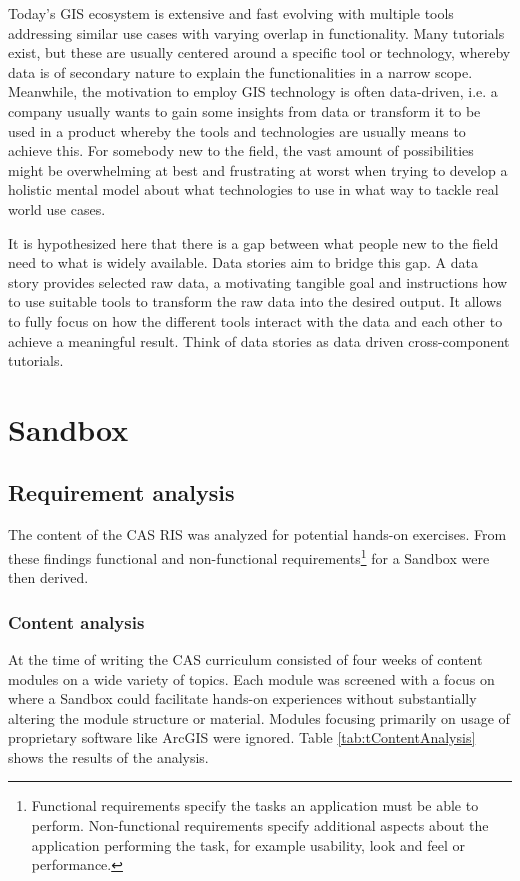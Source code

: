 \documentclass[11pt, a4paper, oneside, parskip=full-]{scrartcl}
\begin{document}
Today's GIS ecosystem is extensive and fast evolving with multiple tools
addressing similar use cases with varying overlap in functionality. Many
tutorials exist, but these are usually centered around a specific tool or
technology, whereby data is of secondary nature to explain the functionalities
in a narrow scope. Meanwhile, the motivation to employ GIS technology is often
data-driven, i.e. a company usually wants to gain some insights from data or
transform it to be used in a product whereby the tools and technologies are
usually means to achieve this. For somebody new to the field, the vast amount of
possibilities might be overwhelming at best and frustrating at worst when trying
to develop a holistic mental model about what technologies to use in what way to
tackle real world use cases.

It is hypothesized here that there is a gap between what people new to the field
need to what is widely available. Data stories aim to bridge this gap. A data
story provides selected raw data, a motivating tangible goal and instructions
how to use suitable tools to transform the raw data into the desired output. It
allows to fully focus on how the different tools interact with the data and each
other to achieve a meaningful result. Think of data stories as data driven
cross-component tutorials.




\section{Sandbox}

\subsection{Requirement analysis} \label{sectionrequirements}

The content of the CAS RIS was analyzed for potential hands-on exercises. From
these findings functional and non-functional requirements\footnote{Functional
requirements specify the tasks an application must be able to perform.
Non-functional requirements specify additional aspects about the application
performing the task, for example usability, look and feel or performance. } for
a Sandbox were then derived.

\subsubsection{Content analysis}
At the time of writing the CAS curriculum consisted of four weeks of content
modules on a wide variety of topics. Each module was screened with a focus on
where a Sandbox could facilitate hands-on experiences without substantially
altering the module structure or material. Modules focusing primarily on usage
of proprietary software like ArcGIS were ignored. Table
\ref{tab:tContentAnalysis} shows the results of the analysis.
\end{document}
